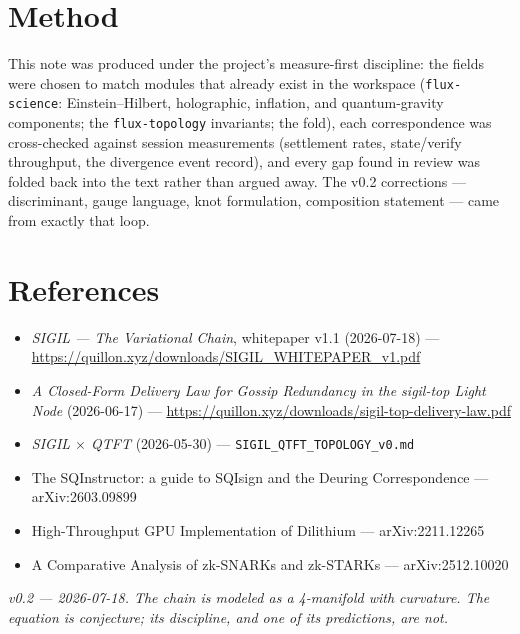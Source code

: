 \documentclass[10pt,a4paper]{article}
\begin{document}
\section{Method}

This note was produced under the project's measure-first discipline: the fields were
chosen to match modules that already exist in the workspace (\texttt{flux-science}:
Einstein--Hilbert, holographic, inflation, and quantum-gravity components; the
\texttt{flux-topology} invariants; the fold), each correspondence was cross-checked
against session measurements (settlement rates, state/verify throughput, the divergence
event record), and every gap found in review was folded back into the text rather than
argued away. The v0.2 corrections — discriminant, gauge language, knot formulation,
composition statement — came from exactly that loop.

\section*{References}

\small
\begin{itemize}[leftmargin=1.2em,itemsep=1pt]
\item \emph{SIGIL — The Variational Chain}, whitepaper v1.1 (2026-07-18) —
\url{https://quillon.xyz/downloads/SIGIL_WHITEPAPER_v1.pdf}
\item \emph{A Closed-Form Delivery Law for Gossip Redundancy in the sigil-top Light
Node} (2026-06-17) — \url{https://quillon.xyz/downloads/sigil-top-delivery-law.pdf}
\item \emph{SIGIL $\times$ QTFT} (2026-05-30) — \texttt{SIGIL\_QTFT\_TOPOLOGY\_v0.md}
\item The SQInstructor: a guide to SQIsign and the Deuring Correspondence —
arXiv:2603.09899
\item High-Throughput GPU Implementation of Dilithium — arXiv:2211.12265
\item A Comparative Analysis of zk-SNARKs and zk-STARKs — arXiv:2512.10020
\end{itemize}

\vspace{0.8em}
\noindent\textit{v0.2 — 2026-07-18. The chain is modeled as a 4-manifold with curvature.
The equation is conjecture; its discipline, and one of its predictions, are not.}
\end{document}
